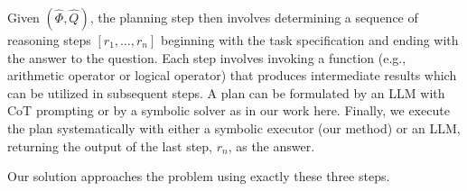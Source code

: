 \documentclass{article}
\theoremstyle{definition}
\newcommand\gd[1]{\todo[color=red!40]{{\bf Greg}: #1}}
\newcommand{\spec}{\Phi}
\newcommand{\query}{Q}
\begin{document}
Given $(\hat{\spec},\hat{\query})$, the planning step then involves determining a sequence of reasoning steps $[r_1,\ldots,r_n]$ beginning with the task specification and ending with the answer to the question. Each step involves invoking a function (e.g., arithmetic operator or logical operator) that produces intermediate results which can be utilized in subsequent steps. A plan can be formulated by an LLM with {\sc CoT} prompting or by a symbolic solver as in our work here.
Finally, we execute the plan systematically with either a symbolic executor (our method) or an LLM, returning the output of the last step, $r_n$, as the answer.

Our solution approaches the problem using exactly these three steps. 
\end{document}
